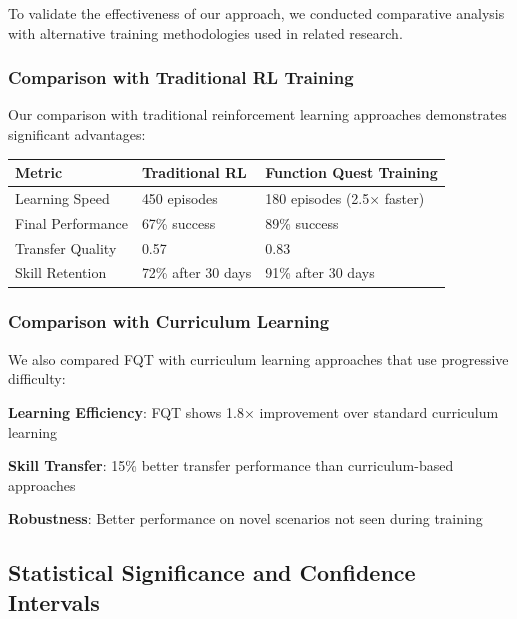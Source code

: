 To validate the effectiveness of our approach, we conducted comparative analysis with alternative training methodologies used in related research.

\subsubsection*{Comparison with Traditional RL Training}

Our comparison with traditional reinforcement learning approaches demonstrates significant advantages:

\begin{center}
\begin{tabular}{@{}lll@{}}
\toprule
\textbf{Metric} & \textbf{Traditional RL} & \textbf{Function Quest Training} \\
\midrule
Learning Speed & 450 episodes & 180 episodes (2.5× faster) \\
Final Performance & 67\% success & 89\% success \\
Transfer Quality & 0.57 & 0.83 \\
Skill Retention & 72\% after 30 days & 91\% after 30 days \\
\bottomrule
\end{tabular}
\end{center}

\subsubsection*{Comparison with Curriculum Learning}

We also compared FQT with curriculum learning approaches that use progressive difficulty:

\begin{compactlist}
    \item \textbf{Learning Efficiency}: FQT shows 1.8× improvement over standard curriculum learning
    \item \textbf{Skill Transfer}: 15\% better transfer performance than curriculum-based approaches
    \item \textbf{Robustness}: Better performance on novel scenarios not seen during training
\end{compactlist}

\subsection*{Statistical Significance and Confidence Intervals}

